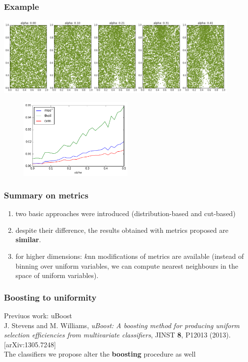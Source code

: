 \documentclass{beamer}
\begin{document}
\begin{frame}
    \frametitle{Example}

    {
    \centering

    \includegraphics[width=0.9\textwidth]{img/metrics_comp1.png}

    
    \begin{figure}
    \centering

    \includegraphics[width=0.5\textwidth]{img/metrics_comp2.png}
    \end{figure}
    }


\end{frame}

\begin{frame}
    \frametitle{Summary on metrics}
    \begin{enumerate}
        \item two basic approaches were introduced (distribution-based and cut-based)
        \item despite their difference, the results obtained with metrics proposed are \textbf{similar}.
        \item for higher dimensions: $k$nn modifications of metrics are available 
        {\small (instead of binning over uniform variables, we can compute nearest neighbours in the space of uniform variables).}
    \end{enumerate}
\end{frame}


\begin{frame}
    \frametitle{Boosting to uniformity}
    Previuos work: uBoost \\
    {\small J. Stevens and M. Williams,
        {\em uBoost: A boosting method for producing uniform selection efficiencies from multivariate classifiers}, 
        JINST {\bf 8}, P12013 (2013). [arXiv:1305.7248]
    }
    \bigskip \\
    The classifiers we propose alter the \textbf{boosting} procedure as well
\end{frame}
\end{document}
